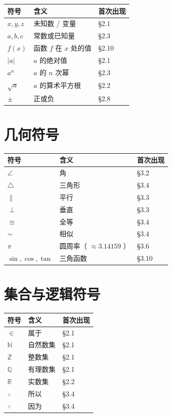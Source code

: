 \begin{center}
\begin{tabular}{lll}
\toprule
符号 & 含义 & 首次出现 \\
\midrule
$x, y, z$ & 未知数 / 变量 & §2.1 \\
$a, b, c$ & 常数或已知量 & §2.3 \\
$f(x)$ & 函数 $f$ 在 $x$ 处的值 & §2.10 \\
$\lvert a \rvert$ & $a$ 的绝对值 & §2.1 \\
$a^n$ & $a$ 的 $n$ 次幂 & §2.3 \\
$\sqrt{a}$ & $a$ 的算术平方根 & §2.2 \\
$\pm$ & 正或负 & §2.8 \\
\bottomrule
\end{tabular}
\end{center}


\section*{几何符号}


\begin{center}
\begin{tabular}{lll}
\toprule
符号 & 含义 & 首次出现 \\
\midrule
$\angle$ & 角 & §3.2 \\
$\triangle$ & 三角形 & §3.4 \\
$\parallel$ & 平行 & §3.3 \\
$\perp$ & 垂直 & §3.3 \\
$\cong$ & 全等 & §3.4 \\
$\sim$ & 相似 & §3.4 \\
$\pi$ & 圆周率（ $\approx 3.14159$ ） & §3.6 \\
$\sin, \cos, \tan$ & 三角函数 & §3.10 \\
\bottomrule
\end{tabular}
\end{center}


\section*{集合与逻辑符号}


\begin{center}
\begin{tabular}{lll}
\toprule
符号 & 含义 & 首次出现 \\
\midrule
$\in$ & 属于 & §2.1 \\
$\mathbb{N}$ & 自然数集 & §2.1 \\
$\mathbb{Z}$ & 整数集 & §2.1 \\
$\mathbb{Q}$ & 有理数集 & §2.1 \\
$\mathbb{R}$ & 实数集 & §2.2 \\
$\therefore$ & 所以 & §3.4 \\
$\because$ & 因为 & §3.4 \\
\bottomrule
\end{tabular}
\end{center}


